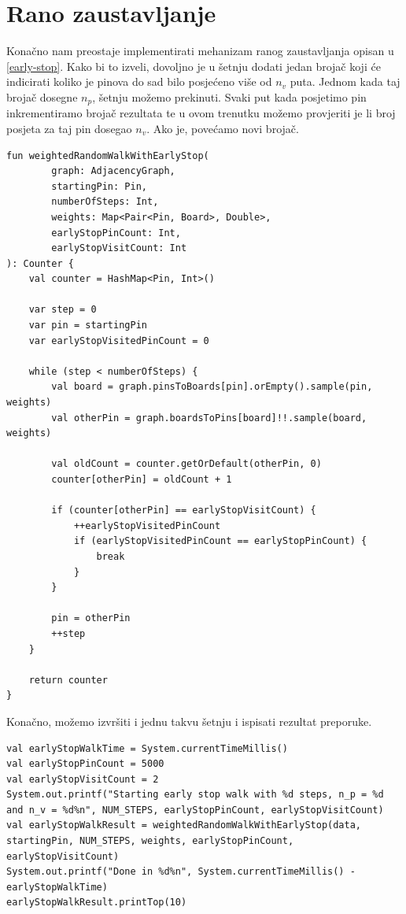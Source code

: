 \documentclass[times, utf8, seminar]{fer}
\begin{document}
\section{Rano zaustavljanje}

Konačno nam preostaje implementirati mehanizam ranog zaustavljanja opisan u \ref{early-stop}. Kako bi to izveli, dovoljno je u šetnju dodati jedan brojač koji će indicirati koliko je pinova do sad bilo posjećeno više od $n_v$ puta. Jednom kada taj brojač dosegne $n_p$, šetnju možemo prekinuti. Svaki put kada posjetimo pin inkrementiramo brojač rezultata te u ovom trenutku možemo provjeriti je li broj posjeta za taj pin dosegao $n_v$. Ako je, povećamo novi brojač.

\begin{lstlisting}
fun weightedRandomWalkWithEarlyStop(
        graph: AdjacencyGraph,
        startingPin: Pin,
        numberOfSteps: Int,
        weights: Map<Pair<Pin, Board>, Double>,
        earlyStopPinCount: Int,
        earlyStopVisitCount: Int
): Counter {
    val counter = HashMap<Pin, Int>()

    var step = 0
    var pin = startingPin
    var earlyStopVisitedPinCount = 0

    while (step < numberOfSteps) {
        val board = graph.pinsToBoards[pin].orEmpty().sample(pin, weights)
        val otherPin = graph.boardsToPins[board]!!.sample(board, weights)

        val oldCount = counter.getOrDefault(otherPin, 0)
        counter[otherPin] = oldCount + 1

        if (counter[otherPin] == earlyStopVisitCount) {
            ++earlyStopVisitedPinCount
            if (earlyStopVisitedPinCount == earlyStopPinCount) {
                break
            }
        }

        pin = otherPin
        ++step
    }

    return counter
}
\end{lstlisting}

Konačno, možemo izvršiti i jednu takvu šetnju i ispisati rezultat preporuke.

\begin{lstlisting}
val earlyStopWalkTime = System.currentTimeMillis()
val earlyStopPinCount = 5000
val earlyStopVisitCount = 2
System.out.printf("Starting early stop walk with %d steps, n_p = %d and n_v = %d%n", NUM_STEPS, earlyStopPinCount, earlyStopVisitCount)
val earlyStopWalkResult = weightedRandomWalkWithEarlyStop(data, startingPin, NUM_STEPS, weights, earlyStopPinCount, earlyStopVisitCount)
System.out.printf("Done in %d%n", System.currentTimeMillis() - earlyStopWalkTime)
earlyStopWalkResult.printTop(10)
\end{lstlisting}
\end{document}
